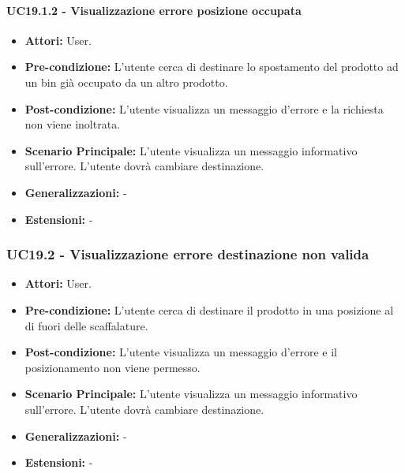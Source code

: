 \paragraph{UC19.1.2 - Visualizzazione errore posizione occupata}
\begin{itemize}
    \item \textbf{Attori:} User.
    \item \textbf{Pre-condizione:}  L'utente cerca di destinare lo spostamento del prodotto ad un bin già occupato da un altro prodotto.
    \item \textbf{Post-condizione:} L'utente visualizza un messaggio d'errore e la richiesta non viene inoltrata.
    \item \textbf{Scenario Principale:} L'utente visualizza un messaggio informativo sull'errore. L'utente dovrà cambiare destinazione.
    \item \textbf{Generalizzazioni:} -
    \item \textbf{Estensioni:} -
\end{itemize}


\subsubsection{UC19.2 - Visualizzazione errore destinazione non valida}
\begin{itemize}
    \item \textbf{Attori:} User.
    \item \textbf{Pre-condizione:}  L'utente cerca di destinare il prodotto in una posizione al di fuori delle scaffalature.
    \item \textbf{Post-condizione:} L'utente visualizza un messaggio d'errore e il posizionamento non viene permesso.
    \item \textbf{Scenario Principale:} L'utente visualizza un messaggio informativo sull'errore. L'utente dovrà cambiare destinazione.
    \item \textbf{Generalizzazioni:} -
    \item \textbf{Estensioni:} -
\end{itemize}